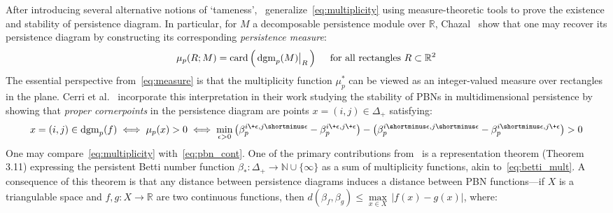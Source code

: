After introducing several alternative notions of `tameness',~\cite{chazal2016structure} generalize~\eqref{eq:multiplicity} using measure-theoretic tools to prove the existence and stability of persistence diagram. In particular, for $M$ a decomposable persistence module over $\mathbb{R}$, Chazal~\cite{chazal2016structure} show that one may recover its persistence diagram by constructing its corresponding \emph{persistence measure}:
\begin{equation}\label{eq:measure}
	\mu_p(R; M) = \mathrm{card}\left( \,
	\restr{\mathrm{dgm}_p(M)}{R} \,
	\right) \quad \text{ for all rectangles } R \subset \mathbb{R}^2 
\end{equation}
The essential perspective from~\eqref{eq:measure} is that the multiplicity function $\mu^\ast_p$ can be viewed as an integer-valued measure over rectangles in the plane. 
Cerri et al.~\cite{cerri2013betti} incorporate this interpretation in their work studying the stability of PBNs in multidimensional persistence by showing that \emph{proper cornerpoints} in the persistence diagram are points $x = (i,j) \in \Delta_+$ satisfying:
\begin{equation}\label{eq:pbn_cont}
	x = (i,j) \in \mathrm{dgm}_p(f) \; \Longleftrightarrow \; \mu_p(x) > 0 \; \Longleftrightarrow \; \min_{\epsilon > 0} \left(\beta_p^{i \+ \epsilon, j \shortminus \epsilon} - \beta_p^{i \+ \epsilon, j \+ \epsilon} \right) - \left(\beta_p^{i \shortminus \epsilon, j \shortminus \epsilon} - \beta_p^{i \shortminus \epsilon, j \+ \epsilon} \right) > 0
\end{equation}
One may compare~\eqref{eq:multiplicity} with~\eqref{eq:pbn_cont}. One of the primary contributions from~\cite{cerri2013betti} is a representation theorem (Theorem 3.11) expressing the persistent Betti number function $\beta_\ast : \Delta_+ \to \mathbb{N}\cup \{\infty\}$ as a sum of multiplicity functions, akin to~\eqref{eq:betti_mult}. 
A consequence of this theorem is that any distance between persistence diagrams induces a distance between PBN functions---if $X$ is a triangulable space and $f,g : X \to \mathbb{R}$ are two continuous functions, then $d(\beta_f, \beta_g) \leq \max\limits_{x \in X} \, \lvert f(x) - g(x) \rvert$, where:
